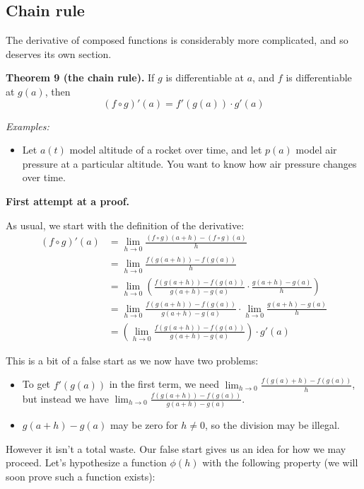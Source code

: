 \subsection{Chain rule}
The derivative of composed functions is considerably more complicated,
and so deserves its own section.

\vs

\textbf{Theorem 9 (the chain rule).} If $g$ is differentiable at $a$,
and $f$ is differentiable at $g(a)$, then
\[(f\circ g)'(a)=f'(g(a))\cdot g'(a)\]

\textit{Examples:}
\begin{itemize}
\item Let $a(t)$ model altitude of a rocket over time, and let $p(a)$
  model air pressure at a particular altitude. You want to know how
  air pressure changes over time.
\end{itemize}

\textbf{First attempt at a proof.}

As usual, we start with the definition of the derivative:
\begin{align*}
  (f\circ g)'(a)&=\lim_{h\to0}\frac{(f\circ g)(a+h)-(f\circ g)(a)}{h}\\
            &=\lim_{h\to0}\frac{f(g(a+h))-f(g(a))}{h}\\
            &=\lim_{h\to0}\left(\frac{f(g(a+h))-f(g(a))}{g(a+h)-g(a)}\cdot\frac{g(a+h)-g(a)}{h}\right)\\
            &=\lim_{h\to0}\frac{f(g(a+h))-f(g(a))}{g(a+h)-g(a)}\cdot\lim_{h\to0}\frac{g(a+h)-g(a)}{h}\\
            &=\left(\lim_{h\to0}\frac{f(g(a+h))-f(g(a))}{g(a+h)-g(a)}\right)\cdot g'(a)
\end{align*}

This is a bit of a false start as we now have two problems:
\begin{itemize}
\item To get $f'(g(a))$ in the first term, we need
  $\lim_{h\to0}\frac{f(g(a)+h)-f(g(a))}{h}$, but instead we have
  $\lim_{h\to0}\frac{f(g(a+h))-f(g(a))}{g(a+h)-g(a)}$.
\item $g(a+h)-g(a)$ may be zero for $h\neq 0$, so the division may be
  illegal.
\end{itemize}

However it isn't a total waste. Our false start gives us an idea for
how we may proceed. Let's hypothesize a function $\phi(h)$ with the
following property (we will soon prove such a function exists):

